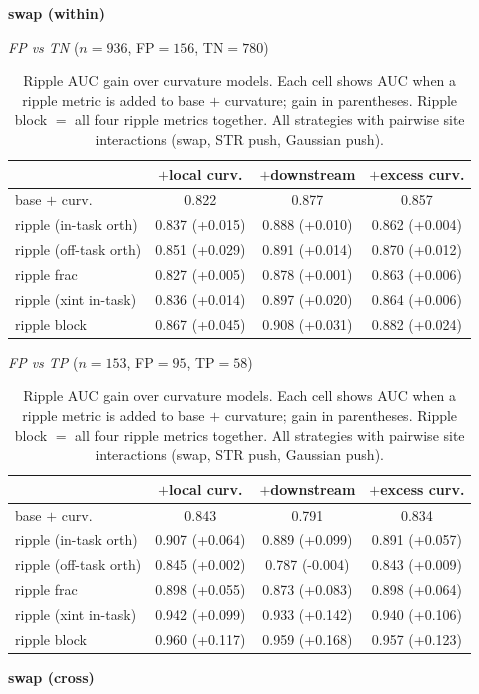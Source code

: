 \begin{table}[t]
\centering
\caption{Ripple AUC gain over curvature models. Each cell shows AUC when a ripple metric is added to base $+$ curvature; gain in parentheses. Ripple block $=$ all four ripple metrics together. All strategies with pairwise site interactions (swap, STR push, Gaussian push).}
\label{tab:ripple-residual}
\small

\medskip
\textbf{swap (within)}


\smallskip
\textit{FP vs TN} ($n=936$, FP$=156$, TN$=780$)

\begin{tabular}{l c c c}
\toprule
 & $+$local curv. & $+$downstream & $+$excess curv. \\
\midrule
base $+$ curv. & 0.822 & 0.877 & 0.857 \\
\midrule
ripple (in-task orth) & 0.837 (+0.015) & 0.888 (+0.010) & 0.862 (+0.004) \\
ripple (off-task orth) & 0.851 (+0.029) & 0.891 (+0.014) & 0.870 (+0.012) \\
ripple frac & 0.827 (+0.005) & 0.878 (+0.001) & 0.863 (+0.006) \\
ripple (xint in-task) & 0.836 (+0.014) & 0.897 (+0.020) & 0.864 (+0.006) \\
ripple block & 0.867 (+0.045) & 0.908 (+0.031) & 0.882 (+0.024) \\
\bottomrule
\end{tabular}

\smallskip
\textit{FP vs TP} ($n=153$, FP$=95$, TP$=58$)

\begin{tabular}{l c c c}
\toprule
 & $+$local curv. & $+$downstream & $+$excess curv. \\
\midrule
base $+$ curv. & 0.843 & 0.791 & 0.834 \\
\midrule
ripple (in-task orth) & 0.907 (+0.064) & 0.889 (+0.099) & 0.891 (+0.057) \\
ripple (off-task orth) & 0.845 (+0.002) & 0.787 (-0.004) & 0.843 (+0.009) \\
ripple frac & 0.898 (+0.055) & 0.873 (+0.083) & 0.898 (+0.064) \\
ripple (xint in-task) & 0.942 (+0.099) & 0.933 (+0.142) & 0.940 (+0.106) \\
ripple block & 0.960 (+0.117) & 0.959 (+0.168) & 0.957 (+0.123) \\
\bottomrule
\end{tabular}

\medskip
\textbf{swap (cross)}



\end{table}
